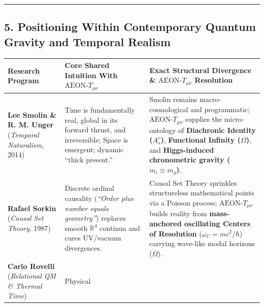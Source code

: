 \documentclass[
]{article}
\newcounter{none} %
\begin{document}
\begin{center}\rule{0.5\linewidth}{0.5pt}\end{center}

\subsection{5. Positioning Within Contemporary Quantum Gravity and
Temporal
Realism}\label{positioning-within-contemporary-quantum-gravity-and-temporal-realism}

{\def\LTcaptype{none} %
\begin{longtable}[]{@{}
  >{\raggedright\arraybackslash}p{}
  >{\raggedright\arraybackslash}p{}
  >{\raggedright\arraybackslash}p{}@{}}
\toprule\noalign{}
\begin{minipage}[b]{\linewidth}\raggedright
Research Program
\end{minipage} & \begin{minipage}[b]{\linewidth}\raggedright
Core Shared Intuition With \(\text{AEON-}T_{\mu\nu}\)
\end{minipage} & \begin{minipage}[b]{\linewidth}\raggedright
Exact Structural Divergence \& \(\text{AEON-}T_{\mu\nu}\) Resolution
\end{minipage} \\
\midrule\noalign{}
\endhead
\bottomrule\noalign{}
\endlastfoot
\textbf{Lee Smolin \& R. M. Unger} (\emph{Temporal Naturalism}, 2014) &
Time is fundamentally real, global in its forward thrust, and
irreversible; Space is emergent; dynamic ``thick present.'' & Smolin
remains macro-cosmological and programmatic; \(\text{AEON-}T_{\mu\nu}\)
supplies the micro-ontology of \textbf{Diachronic Identity (\(A_s^v\))},
\textbf{Functional Infinity (\(\Omega\))}, and \textbf{Higgs-induced
chronometric gravity (\(m_i \equiv m_g\))}. \\
\textbf{Rafael Sorkin} (\emph{Causal Set Theory}, 1987) & Discrete
ordinal causality (\emph{``Order plus number equals geometry''})
replaces smooth \(\mathbb{R}^4\) continua and cures UV/vacuum
divergences. & Causal Set Theory sprinkles structureless mathematical
points via a Poisson process; \(\text{AEON-}T_{\mu\nu}\) builds reality
from \textbf{mass-anchored oscillating Centers of Resolution}
(\(\omega_C = mc^2/\hbar\)) carrying wave-like modal horizons
(\(\Omega\)). \\
\textbf{Carlo Rovelli} (\emph{Relational QM \& Thermal Time}) & Physical

\end{longtable}}
\end{document}
